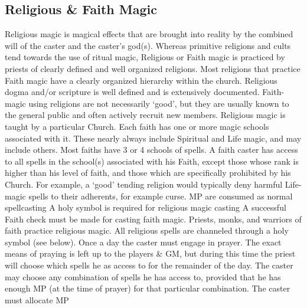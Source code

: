 \documentclass[twoside]{book}
\begin{document}
\subsection{Religious \& Faith Magic}
      Religious magic is magical effects that are brought
               into reality by the combined will of the caster and the
               caster's god(s). Whereas primitive religions and
               cults tend towards the use of ritual magic, Religious or
               Faith magic is practiced by priests of clearly defined and
               well organized religions. Most religions that practice
               Faith magic have a clearly organized hierarchy within the
               church. Religious dogma and/or scripture is well defined
               and is extensively documented. Faith-magic using religions
               are not necessarily `good', but they are
               usually known to the general public and often actively
               recruit new members.   Religious magic is taught by a particular Church.
               Each faith has one or more magic schools associated with
               it. These nearly always include Spiritual and Life magic,
               and may include others. Most faiths have 3 or 4 schools of
               spells. A faith caster has access to all spells in the
               school(s) associated with his Faith, except those whose
               rank is higher than his level of faith, and those which
               are specifically prohibited by his Church. For example, a
               `good' tending religion would typically deny
               harmful Life-magic spells to their adherents, for example
               curse.   
                MP are consumed as normal spellcasting   
                  A holy symbol is required for religious magic
                 casting 
                  A successful Faith check must be made for casting
                 faith magic. 
              Priests, monks, and warriors of faith practice
               religious magic. All religious spells are channeled
               through a holy symbol (see below).   Once a day the caster must engage in prayer. The
               exact means of praying is left up to the players \& GM,
               but during this time the priest will choose which spells
               he as access to for the remainder of the day. The caster
               may choose any combination of spells he has access to,
               provided that he has enough MP (at the time of prayer) for
               that particular combination. The caster must allocate MP
\end{document}
